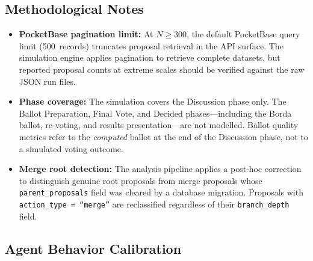 \documentclass[a4paper, 12pt, twoside]{iviathesis}
\begin{document}
\subsection{Methodological Notes}

\begin{itemize}
    \item \textbf{PocketBase pagination limit:} At $N \geq 300$, the default PocketBase query limit (500~records) truncates proposal retrieval in the API surface. The simulation engine applies pagination to retrieve complete datasets, but reported proposal counts at extreme scales should be verified against the raw JSON run files.
    \item \textbf{Phase coverage:} The simulation covers the Discussion phase only. The Ballot Preparation, Final Vote, and Decided phases---including the Borda ballot, re-voting, and results presentation---are not modelled. Ballot quality metrics refer to the \textit{computed} ballot at the end of the Discussion phase, not to a simulated voting outcome.
    \item \textbf{Merge root detection:} The analysis pipeline applies a post-hoc correction to distinguish genuine root proposals from merge proposals whose \texttt{parent\_proposals} field was cleared by a database migration. Proposals with \texttt{action\_type = ``merge''} are reclassified regardless of their \texttt{branch\_depth} field.
\end{itemize}

\subsection{Agent Behavior Calibration}
\label{sec:appendix-calibration}
\end{document}
